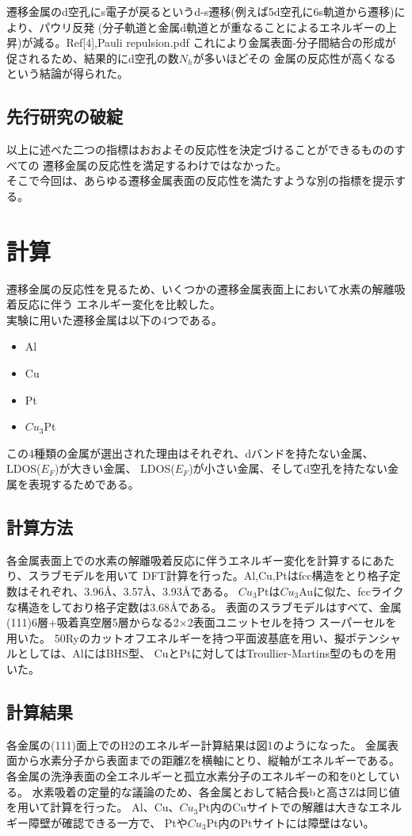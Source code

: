 \documentclass[12pt]{ltjsarticle}
\begin{document}
遷移金属のd空孔にs電子が戻るというd-s遷移(例えば5d空孔に6s軌道から遷移)により、パウリ反発
(分子軌道と金属d軌道とが重なることによるエネルギーの上昇)が減る。Ref[4],Pauli repulsion.pdf
これにより金属表面-分子間結合の形成が促されるため、結果的にd空孔の数$N_h$が多いほどその
金属の反応性が高くなるという結論が得られた。

\subsection{先行研究の破綻}
以上に述べた二つの指標はおおよその反応性を決定づけることができるもののすべての
遷移金属の反応性を満足するわけではなかった。\\
そこで今回は、あらゆる遷移金属表面の反応性を満たすような別の指標を提示する。

\section{計算}
遷移金属の反応性を見るため、いくつかの遷移金属表面上において水素の解離吸着反応に伴う
エネルギー変化を比較した。\\
実験に用いた遷移金属は以下の4つである。

\begin{itemize}
 \item Al
 \item Cu
 \item Pt
 \item $Cu_{3}$Pt
\end{itemize}

この4種類の金属が選出された理由はそれぞれ、dバンドを持たない金属、LDOS($E_F$)が大きい金属、
LDOS($E_F$)が小さい金属、そしてd空孔を持たない金属を表現するためである。

\subsection{計算方法}
各金属表面上での水素の解離吸着反応に伴うエネルギー変化を計算するにあたり、スラブモデルを用いて
DFT計算を行った。Al,Cu,Ptはfcc構造をとり格子定数はそれぞれ、3.96Å、3.57Å、3.93Åである。
$Cu_3$Ptは$Cu_3$Auに似た、fccライクな構造をしており格子定数は3.68Åである。
表面のスラブモデルはすべて、金属(111)6層+吸着真空層5層からなる2×2表面ユニットセルを持つ
スーパーセルを用いた。
50Ryのカットオフエネルギーを持つ平面波基底を用い、擬ポテンシャルとしては、AlにはBHS型、
CuとPtに対してはTroullier-Martins型のものを用いた。

\subsection{計算結果}
各金属の(111)面上でのH2のエネルギー計算結果は図1のようになった。  
金属表面から水素分子から表面までの距離Zを横軸にとり、縦軸がエネルギーである。
各金属の洗浄表面の全エネルギーと孤立水素分子のエネルギーの和を0としている。
水素吸着の定量的な議論のため、各金属とおして結合長bと高さZは同じ値を用いて計算を行った。
Al、Cu、$Cu_3$Pt内のCuサイトでの解離は大きなエネルギー障壁が確認できる一方で、
Ptや$Cu_3$Pt内のPtサイトには障壁はない。
\end{document}
